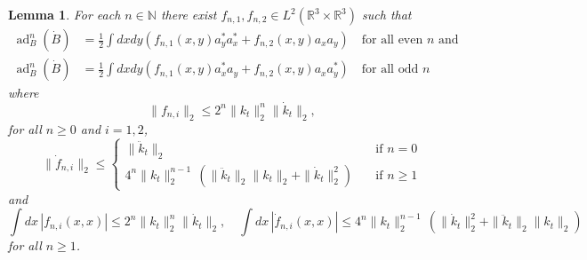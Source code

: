 \documentclass[11pt,a4paper]{article}
\newtheorem{lem}[thm]{Lemma}
\newcommand{\ad}{\operatorname{ad}}	%
\newcommand{\di}{{d}}		%
\newcommand{\Rbb}{\mathbb{R}}		%
\newcommand{\Nbb}{\mathbb{N}}		%
\newcommand{\norm}[1]{\lVert#1\rVert}	%
\begin{document}
\begin{lem}
\label{lm:highercommutators}
 For each $n \in \Nbb$ there exist $f_{n,1}, f_{n,2} \in L^2(\Rbb^3 \times \Rbb^3)$ such that
\begin{equation}\label{eq:adnBB} \begin{split}
\ad^n_B(\dot B) &= \frac{1}{2} \int \di x\di y\left( f_{n,1}(x,y) a^\ast_y a^\ast_x + f_{n,2}(x,y) a_x a_y \right) \quad \text{for all even $n$ and }\\
\ad^n_B(\dot B) &= \frac{1}{2} \int \di x\di y\left( f_{n,1}(x,y) a^\ast_x a_y + f_{n,2}(x,y) a_x a^\ast_y \right) \quad \text{for all odd $n$}
\end{split} \end{equation}
where \begin{equation}\label{eq:est-fn}  \| f_{n,i} \|_2  \leq 2^n \norm{k_t}_2^n \| \dot{k}_t \|_2 , 
\end{equation}
for all $n \geq 0$ and $i=1,2$, 
\begin{equation}\label{eq:est-dotfn}
\| \dot{f}_{n,i} \|_2 \leq \left\{ \begin{array}{ll} \| \ddot k_t \|_2 \quad & \text{if } n = 0 \\ 
4^n \| k_t \|_2^{n-1} \, \left( \| \ddot{k}_t \|_2  \| k_t \|_2 + \|\dot{k}_t \|_2^{2} \right) \quad & \text{if } n \geq 1 \end{array} \right. 
\end{equation}
and
\begin{equation}\label{eq:est-fn2} \int dx  \, |f_{n,i} (x,x)|  \leq  2^n \norm{k_t}_2^n \| \dot{k}_t \|_2 , \quad \int dx \, | \dot{f}_{n,i} (x,x)| \leq  4^n \| k_t \|_2^{n-1} \, \left( \| \dot{k}_t \|_2^2 + \| \ddot{k}_t \|_2 \| k_t \|_2\right)
\end{equation}
for all $n \geq 1$.  
\end{lem}
\end{document}
